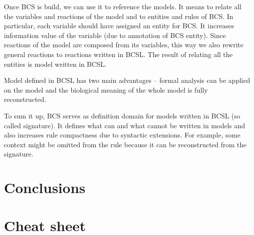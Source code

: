 \documentclass[12pt]{fithesis2}
\begin{document}
Once BCS is build, we can use it to reference the models. It means to relate all the variables and reactions of the model and to entities and rules of BCS. In particular, each variable should have assigned an entity for BCS. It increases information value of the variable (due to annotation of BCS entity). Since reactions of the model are composed from its variables, this way we also rewrite general reactions to reactions written in BCSL. The result of relating all the entities is model written in BCSL. 

Model defined in BCSL has two main advantages -- formal analysis can be applied on the model and the biological meaning of the whole model is fully reconstructed.

To sum it up, BCS serves as definition domain for models written in BCSL (so called signature). It defines what can and what cannot be written in models and also increases rule compactness due to syntactic extensions. For example, some context might be omitted from the rule because it can be reconstructed from the signature.

\chapter{Conclusions}




\appendix

\chapter{Cheat sheet}
\end{document}
